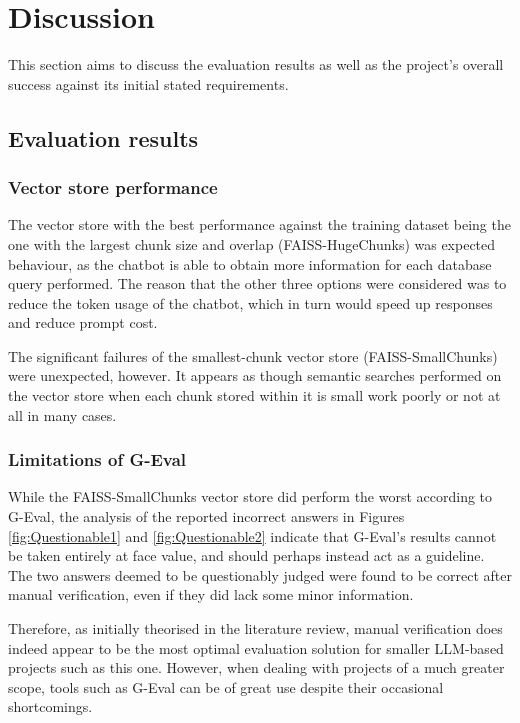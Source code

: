\section{Discussion}
This section aims to discuss the evaluation results as well as the project's overall success against its initial stated requirements.

\subsection{Evaluation results}
\subsubsection{Vector store performance}
The vector store with the best performance against the training dataset being the one with the largest chunk size and overlap (FAISS-HugeChunks) 
was expected behaviour, as the chatbot is able to obtain more information for each database query performed. The reason that the 
other three options were considered was to reduce the token usage of the chatbot, which in turn would speed up responses and reduce 
prompt cost.

\para The significant failures of the smallest-chunk vector store (FAISS-SmallChunks) were unexpected, however. It appears as though 
semantic searches performed on the vector store when each chunk stored within it is small work poorly or not at all in many cases.  

\subsubsection{Limitations of G-Eval}
While the FAISS-SmallChunks vector store did perform the worst according to G-Eval, the analysis of the reported incorrect answers in Figures 
\ref{fig:Questionable1} and \ref{fig:Questionable2} indicate that G-Eval's results cannot be taken entirely at face value, and should perhaps 
instead act as a guideline. The two answers deemed to be questionably judged were found to be correct after manual verification, even if they 
did lack some minor information.

\para Therefore, as initially theorised in the literature review, manual verification does indeed appear to be the most optimal evaluation solution 
for smaller LLM-based projects such as this one. However, when dealing with projects of a much greater scope, tools such as G-Eval can be of great 
use despite their occasional shortcomings.

